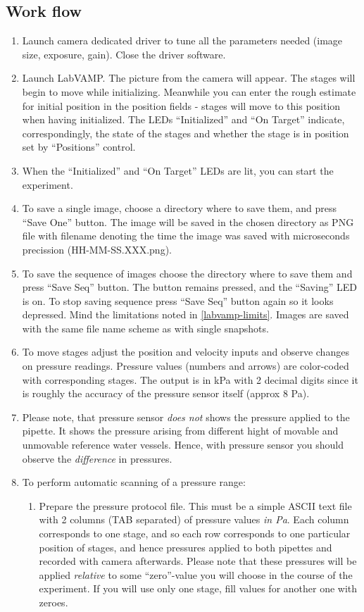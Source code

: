 \documentclass[a4paper,12pt]{article}
\begin{document}
\subsection{Work flow}\label{labvamp-work}
\begin{enumerate}
	\item Launch camera dedicated driver to tune all the parameters needed (image size, exposure, gain). Close the driver software.
	\item Launch LabVAMP. The picture from the camera will appear. The stages will begin to move while initializing. Meanwhile you can enter the rough estimate for initial position in the position fields - stages will move to this position when having initialized. The LEDs ``Initialized'' and ``On Target'' indicate, correspondingly, the state of the stages and whether the stage is in position set by ``Positions'' control.
	\item When the ``Initialized'' and ``On Target'' LEDs are lit, you can start the experiment.
	\item To save a single image, choose a directory where to save them, and press ``Save One'' button. The image will be saved in the chosen directory as PNG file with filename denoting the time the image was saved with microseconds precission (HH-MM-SS.XXX.png).
	\item To save the sequence of images choose the directory where to save them and press ``Save Seq'' button. The button remains pressed, and the ``Saving'' LED is on. To stop saving sequence press ``Save Seq'' button again so it looks depressed. Mind the limitations noted in \ref{labvamp-limits}. Images are saved with the same file name scheme as with single snapshots.
	\item To move stages adjust the position and velocity inputs and observe changes on pressure readings. Pressure values (numbers and arrows) are color-coded with corresponding stages. The output is in kPa with 2 decimal digits since it is roughly the accuracy of the pressure sensor itself (approx 8 Pa).
	\item Please note, that pressure sensor \emph{does not} shows the pressure applied to the pipette. It shows the pressure arising from different hight of movable and unmovable reference water vessels. Hence, with pressure sensor you should observe the \emph{difference} in pressures.
	\item To perform automatic scanning of a pressure range:
	\begin{enumerate}
		\item Prepare the pressure protocol file. This must be a simple ASCII text file with 2 columns (TAB separated) of pressure values \emph{in Pa}. Each column corresponds to one stage, and so each row corresponds to one particular position of stages, and hence pressures applied to both pipettes and recorded with camera afterwards. Please note that these pressures will be applied \emph{relative} to some ``zero''-value you will choose in the course of the experiment. If you will use only one stage, fill values for another one with zeroes.

\end{enumerate}
\end{enumerate}
\end{document}

